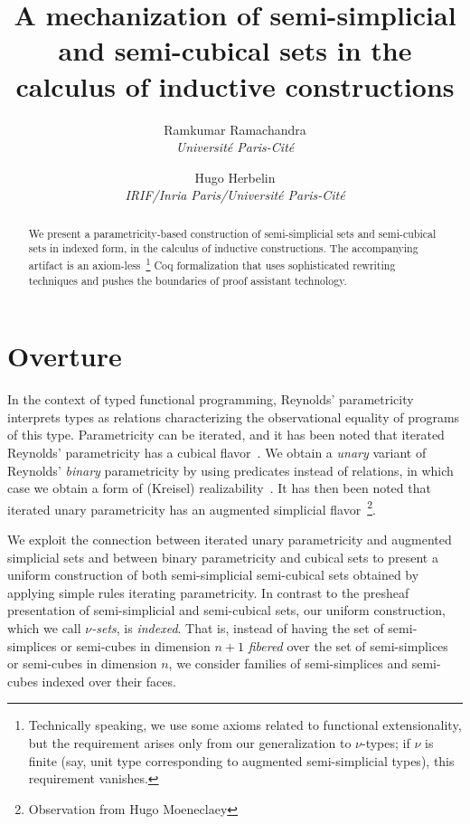 \documentclass[10pt]{art.cls/art}
\title{A mechanization of semi-simplicial and semi-cubical sets in the calculus of inductive constructions}
\author{
  \textcolor{gray80}{Ramkumar Ramachandra} \\
  \itshape \textcolor{gray80}{Université Paris-Cité}
  \and
  \textcolor{gray80}{Hugo Herbelin} \\
  \itshape \textcolor{gray80}{IRIF/Inria Paris/Université Paris-Cité}
}
\date{}
\begin{document}
\thispagestyle{empty}
\maketitle
\begin{abstract}
  We present a parametricity-based construction of semi-simplicial sets and semi-cubical sets in indexed form, in the calculus of inductive constructions. The accompanying artifact is an axiom-less~\footnote{Technically speaking, we use some axioms related to functional extensionality, but the requirement arises only from our generalization to $\nu$-types; if $\nu$ is finite (say, unit type corresponding to augmented semi-simplicial types), this requirement vanishes.} Coq formalization that uses sophisticated rewriting techniques and pushes the boundaries of proof assistant technology.
\end{abstract}
\tableofcontents
\newpage

\section{Overture}

In the context of typed functional programming, Reynolds' parametricity~\cite{Reynolds72} interprets types as relations characterizing the observational equality of programs of this type. Parametricity can be iterated, and it has been noted that iterated Reynolds' parametricity has a cubical flavor~\cite{Johann17,Altenkirch15,Moulin16}. We obtain a \emph{unary} variant of Reynolds' \emph{binary} parametricity by using predicates instead of relations, in which case we obtain a form of (Kreisel) realizability~\cite{Bernardy12,Moulin16}. It has then been noted that iterated unary parametricity has an augmented simplicial flavor~\footnote{Observation from Hugo Moeneclaey}.

We exploit the connection between iterated unary parametricity and augmented simplicial sets and between binary parametricity and cubical sets to present a uniform construction of both semi-simplicial semi-cubical sets obtained by applying simple rules iterating parametricity.  In contrast to the presheaf presentation of semi-simplicial and semi-cubical sets, our uniform construction, which we call \emph{$\nu$-sets}, is \emph{indexed}. That is, instead of having the set of semi-simplices or semi-cubes in dimension $n+1$
\emph{fibered} over the set of semi-simplices or semi-cubes in dimension $n$, we consider families of semi-simplices and semi-cubes indexed over their faces.
\end{document}
